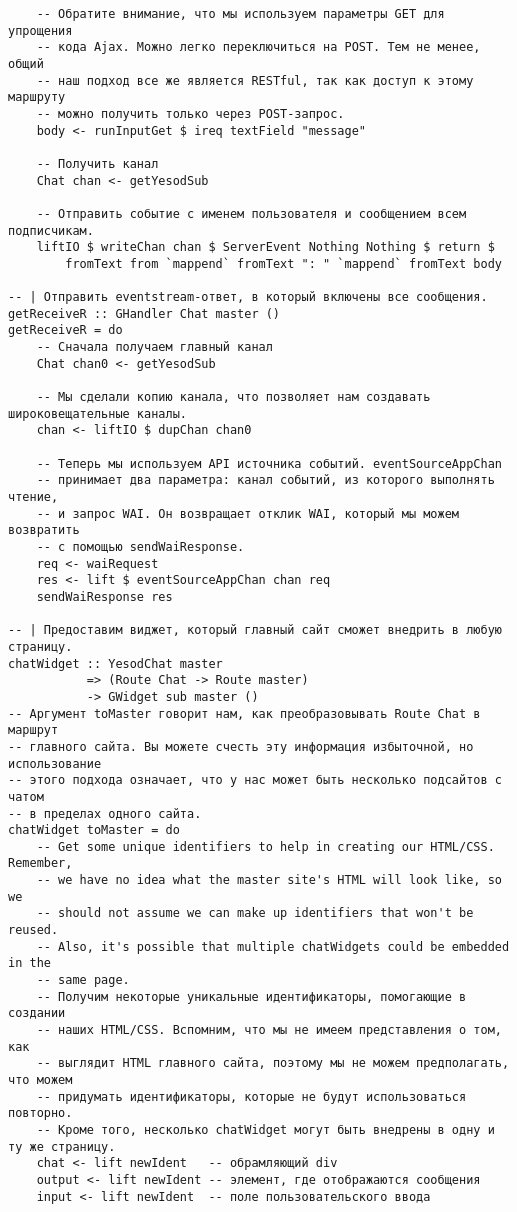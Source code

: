 \begin{lstlisting}
    -- Обратите внимание, что мы используем параметры GET для упрощения
    -- кода Ajax. Можно легко переключиться на POST. Тем не менее, общий 
    -- наш подход все же является RESTful, так как доступ к этому маршруту
    -- можно получить только через POST-запрос.
    body <- runInputGet $ ireq textField "message"

    -- Получить канал
    Chat chan <- getYesodSub

    -- Отправить событие с именем пользователя и сообщением всем подписчикам.
    liftIO $ writeChan chan $ ServerEvent Nothing Nothing $ return $
        fromText from `mappend` fromText ": " `mappend` fromText body

-- | Отправить eventstream-ответ, в который включены все сообщения.
getReceiveR :: GHandler Chat master ()
getReceiveR = do
    -- Сначала получаем главный канал
    Chat chan0 <- getYesodSub

    -- Мы сделали копию канала, что позволяет нам создавать широковещательные каналы.
    chan <- liftIO $ dupChan chan0

    -- Теперь мы используем API источника событий. eventSourceAppChan
    -- принимает два параметра: канал событий, из которого выполнять чтение,
    -- и запрос WAI. Он возвращает отклик WAI, который мы можем возвратить
    -- с помощью sendWaiResponse.
    req <- waiRequest
    res <- lift $ eventSourceAppChan chan req
    sendWaiResponse res

-- | Предоставим виджет, который главный сайт сможет внедрить в любую страницу.
chatWidget :: YesodChat master
           => (Route Chat -> Route master)
           -> GWidget sub master ()
-- Аргумент toMaster говорит нам, как преобразовывать Route Chat в маршрут
-- главного сайта. Вы можете счесть эту информация избыточной, но использование
-- этого подхода означает, что у нас может быть несколько подсайтов с чатом
-- в пределах одного сайта.
chatWidget toMaster = do
    -- Get some unique identifiers to help in creating our HTML/CSS. Remember,
    -- we have no idea what the master site's HTML will look like, so we
    -- should not assume we can make up identifiers that won't be reused.
    -- Also, it's possible that multiple chatWidgets could be embedded in the
    -- same page.
    -- Получим некоторые уникальные идентификаторы, помогающие в создании
    -- наших HTML/CSS. Вспомним, что мы не имеем представления о том, как
    -- выглядит HTML главного сайта, поэтому мы не можем предполагать, что можем
    -- придумать идентификаторы, которые не будут использоваться повторно.
    -- Кроме того, несколько chatWidget могут быть внедрены в одну и ту же страницу.
    chat <- lift newIdent   -- обрамляющий div
    output <- lift newIdent -- элемент, где отображаются сообщения
    input <- lift newIdent  -- поле пользовательского ввода


\end{lstlisting}
